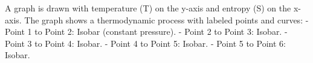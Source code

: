 A graph is drawn with temperature (T) on the y-axis and entropy (S) on the x-axis. The graph shows a thermodynamic process with labeled points and curves:  
- Point 1 to Point 2: Isobar (constant pressure).  
- Point 2 to Point 3: Isobar.  
- Point 3 to Point 4: Isobar.  
- Point 4 to Point 5: Isobar.  
- Point 5 to Point 6: Isobar.